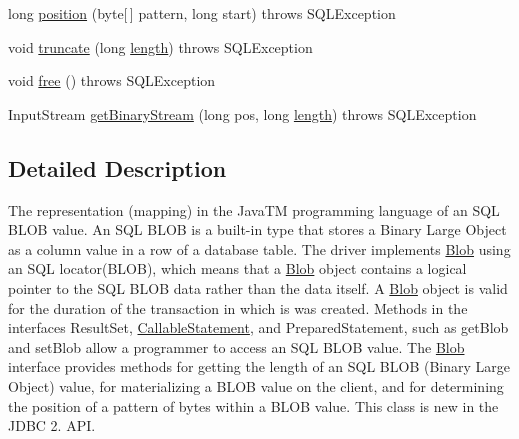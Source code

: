 \begin{DoxyCompactItemize}
\item 
long \mbox{\hyperlink{classcom_1_1mysql_1_1cj_1_1jdbc_1_1_blob_from_locator_ac653f12b01e1b120afacc0e9f0efa4e4}{position}} (byte\mbox{[}$\,$\mbox{]} pattern, long start)  throws S\+Q\+L\+Exception 
\item 
void \mbox{\hyperlink{classcom_1_1mysql_1_1cj_1_1jdbc_1_1_blob_from_locator_aa3292b305786ffdcaf63ccaab6ff620b}{truncate}} (long \mbox{\hyperlink{classcom_1_1mysql_1_1cj_1_1jdbc_1_1_blob_from_locator_a6eea7dd5b29ebcd066beac855648fe35}{length}})  throws S\+Q\+L\+Exception 
\item 
void \mbox{\hyperlink{classcom_1_1mysql_1_1cj_1_1jdbc_1_1_blob_from_locator_a88c2c807229112622b1d1369d6e2d682}{free}} ()  throws S\+Q\+L\+Exception 
\item 
Input\+Stream \mbox{\hyperlink{classcom_1_1mysql_1_1cj_1_1jdbc_1_1_blob_from_locator_aa77f948ff1858ec329525385e63e4e46}{get\+Binary\+Stream}} (long pos, long \mbox{\hyperlink{classcom_1_1mysql_1_1cj_1_1jdbc_1_1_blob_from_locator_a6eea7dd5b29ebcd066beac855648fe35}{length}})  throws S\+Q\+L\+Exception 
\end{DoxyCompactItemize}


\subsection{Detailed Description}
The representation (mapping) in the Java\+TM programming language of an S\+QL B\+L\+OB value. An S\+QL B\+L\+OB is a built-\/in type that stores a Binary Large Object as a column value in a row of a database table. The driver implements \mbox{\hyperlink{classcom_1_1mysql_1_1cj_1_1jdbc_1_1_blob}{Blob}} using an S\+QL locator(\+B\+L\+O\+B), which means that a \mbox{\hyperlink{classcom_1_1mysql_1_1cj_1_1jdbc_1_1_blob}{Blob}} object contains a logical pointer to the S\+QL B\+L\+OB data rather than the data itself. A \mbox{\hyperlink{classcom_1_1mysql_1_1cj_1_1jdbc_1_1_blob}{Blob}} object is valid for the duration of the transaction in which is was created. Methods in the interfaces Result\+Set, \mbox{\hyperlink{classcom_1_1mysql_1_1cj_1_1jdbc_1_1_callable_statement}{Callable\+Statement}}, and Prepared\+Statement, such as get\+Blob and set\+Blob allow a programmer to access an S\+QL B\+L\+OB value. The \mbox{\hyperlink{classcom_1_1mysql_1_1cj_1_1jdbc_1_1_blob}{Blob}} interface provides methods for getting the length of an S\+QL B\+L\+OB (Binary Large Object) value, for materializing a B\+L\+OB value on the client, and for determining the position of a pattern of bytes within a B\+L\+OB value. This class is new in the J\+D\+BC 2. A\+PI. 

